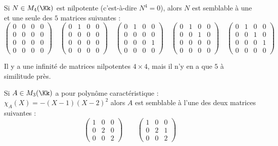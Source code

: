 \documentclass[12pt, class=report,crop=false]{standalone}
\begin{document}
\begin{exemple}
Si $N \in M_4(\Kk)$ est nilpotente (c'est-à-dire $N^4 = 0$), alors $N$ est semblable à une et une seule des $5$ matrices suivantes :
\[
\begin{pmatrix}
0&0&0&0\\
0&0&0&0\\
0&0&0&0\\
0&0&0&0
\end{pmatrix}
\quad 
\begin{pmatrix}
0&1&0&0\\
0&0&0&0\\
0&0&0&0\\
0&0&0&0
\end{pmatrix} \quad
\begin{pmatrix}
0&1&0&0\\
0&0&0&0\\
0&0&0&1\\
0&0&0&0
\end{pmatrix} \quad
\begin{pmatrix}
0&1&0&0\\
0&0&1&0\\
0&0&0&0\\
0&0&0&0
\end{pmatrix} \quad
\begin{pmatrix}
0&1&0&0\\
0&0&1&0\\
0&0&0&1\\
0&0&0&0
\end{pmatrix}
 \] 

Il y a une infinité de matrices nilpotentes $4 \times 4$, mais il n'y en a que $5$ à similitude près.

\end{exemple}

\begin{exemple}
Si $A \in M_3(\Kk)$ a pour polynôme caractéristique : $ \chi_A(X) = -(X-1)(X-2)^2$ alors $A$ est semblable 
à l'une des deux matrices suivantes :
\[
\begin{pmatrix}
1&0&0\\
0&2&0\\
0&0&2
\end{pmatrix} \qquad
\begin{pmatrix}
1&0&0\\
0&2&1\\
0&0&2
\end{pmatrix}
\]
\end{exemple}
\end{document}
